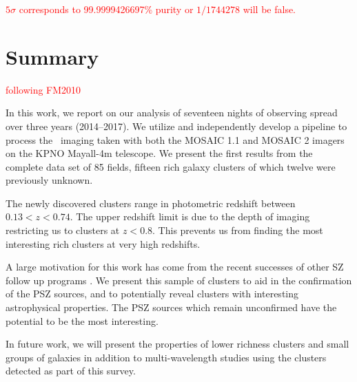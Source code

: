 \documentclass[apj, revtex4-1]{emulateapj}
\newcommand{\editorial}[1]{\textcolor{red}{#1}}
\begin{document}
\editorial{$5\sigma$ corresponds to 99.9999426697\% purity or $1/1744278$ will be false.}

\section{Summary}\label{sec:summary}

\editorial{following FM2010}

In this work, we report on our analysis of seventeen nights of observing spread over three years (2014--2017). We utilize and independently develop a pipeline to process the \sdssg\sdssr\sdssi\sdssz\ imaging taken with both the MOSAIC 1.1 and MOSAIC 2 imagers on the KPNO Mayall-4m telescope. We present the first results from the complete data set of 85 fields, fifteen rich galaxy clusters of which twelve were previously unknown.

The newly discovered clusters range in photometric redshift between $0.13 < z < 0.74$. The upper redshift limit is due to the depth of imaging restricting us to clusters at $z<0.8$. This prevents us from finding the most interesting rich clusters at very high redshifts.

A large motivation for this work has come from the recent successes of other SZ follow up programs . We present this sample of clusters to aid in the confirmation of the PSZ sources, and to potentially reveal clusters with interesting astrophysical properties. The PSZ sources which remain unconfirmed have the potential to be the most interesting.

In future work, we will present the properties of lower richness clusters and small groups of galaxies in addition to multi-wavelength studies using the clusters detected as part of this survey.
\end{document}

